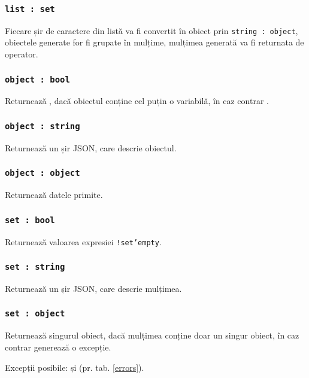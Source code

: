 \subsubsection{\texttt{list : set}}

Fiecare șir de caractere din listă va fi convertit în obiect prin \texttt{string : object}, obiectele generate for fi grupate în mulțime, mulțimea generată va fi returnata de operator.

\subsubsection{\texttt{object : bool}}

Returnează \true, dacă obiectul conține cel puțin o variabilă, în caz contrar \false.

\subsubsection{\texttt{object : string}}

Returnează un șir JSON, care descrie obiectul.

\subsubsection{\texttt{object : object}}

Returnează datele primite.

\subsubsection{\texttt{set : bool}}

Returnează valoarea expresiei \texttt{!set'empty}.

\subsubsection{\texttt{set : string}}

Returnează un șir JSON, care descrie mulțimea.

\subsubsection{\texttt{set : object}}

Returnează singurul obiect, dacă mulțimea conține doar un singur obiect, în caz contrar generează o excepție.

Excepții posibile:  și  (pr. tab. \ref{errors}).

